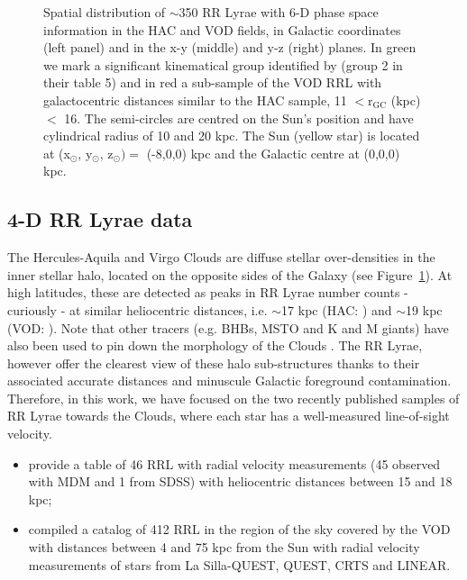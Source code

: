 \documentclass[fleqn,usenatbib]{mnras}
\begin{document}
\begin{figure}
	\vspace{-0.55cm}
    \caption{Spatial distribution of $\sim$350 RR Lyrae with 6-D phase space information in the HAC and VOD fields, in Galactic coordinates (left panel) and in the x-y (middle) and y-z (right) planes. In green we mark a significant kinematical group identified by \citet{Vivas2016} (group 2 in their table 5) and in red a sub-sample of the VOD RRL with galactocentric distances similar to the HAC sample, 11 $<\mathrm{r_{GC}}$ (kpc)$<$ 16. The semi-circles are centred on the Sun's position and have cylindrical radius of 10 and 20 kpc. The Sun (yellow star) is located at (x$_{\odot}$, y$_{\odot}$, z$_{\odot})= $ (-8,0,0) kpc and the Galactic centre at (0,0,0) kpc.  }
    \label{fig:lb}
\end{figure}
%
\subsection{4-D RR Lyrae data}
%
The Hercules-Aquila and Virgo Clouds are diffuse stellar
over-densities in the inner stellar halo, located on the opposite
sides of the Galaxy (see Figure~\ref{fig:lb}). At high latitudes,
these are detected as peaks in RR Lyrae number counts - curiously - at
similar heliocentric distances, i.e. $\sim$17 kpc (HAC:
\citealt{Wa09,Simion2014}) and $\sim$19 kpc (VOD: \citealt{Vivas2006,
  Duffau2014, Vivas2016}). Note that other tracers (e.g. BHBs, MSTO
and K and M giants) have also been used to pin down the morphology of
the Clouds \citep[see
  e.g.][]{Be07,Juric2008,Sharma2010,Bonaca2012,Conroy2018}. The RR
Lyrae, however offer the clearest view of these halo sub-structures
thanks to their associated accurate distances and minuscule Galactic
foreground contamination. Therefore, in this work, we have focused on
the two recently published samples of RR Lyrae towards the Clouds,
where each star has a well-measured line-of-sight velocity.
%
\begin{itemize}
\item \citet{Simion2018} provide a table of 46 RRL with radial
  velocity measurements (45 observed with MDM and 1 from SDSS) with
  heliocentric distances between 15 and 18 kpc;
\item \cite{Vivas2016} compiled a catalog of 412 RRL in the region of
  the sky covered by the VOD with distances between 4 and 75 kpc from
  the Sun with radial velocity measurements of stars from La
  Silla-QUEST, QUEST, CRTS and LINEAR.
\end{itemize}
%
%
\end{document}
